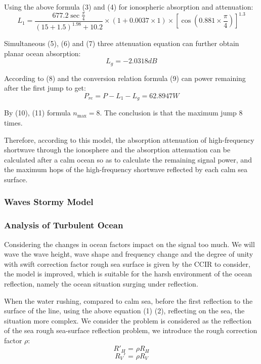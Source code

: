 \documentclass{mcmthesis}
\begin{document}
Using the above formula (3) and (4) for ionospheric absorption and attenuation:
\begin{equation} \label{12}
{L_1} = \frac{{677.2\sec \frac{\pi }{4}}}{{{{(15 + 1.5)}^{1.98}} + 10.2}} \times (1 + 0.0037 \times 1) \times {[\cos (0.881 \times \frac{\pi }{4})]^{1.3}}
\end{equation}

Simultaneous (5), (6) and (7) three attenuation equation can further obtain planar ocean absorption:
\begin{equation} \label{13}
{L_g} =  - 2.0318dB
\end{equation}

According to (8) and the conversion relation formula (9) can power remaining after the first jump to get:
\begin{equation} \label{14}
{P_{re}} = P - {L_1} - {L_g} = 62.8947W
\end{equation}

By (10), (11) formula ${n_{\max }} = 8$. The conclusion is that the maximum jump 8 times.

Therefore, according to this model, the absorption attenuation of high-frequency shortwave through the ionosphere and the absorption attenuation can be calculated after a calm ocean so as to calculate the remaining signal power, and the maximum hops of the high-frequency shortwave reflected by each calm sea surface.


\subsubsection{Waves Stormy Model}

\subsubsection{Analysis of Turbulent Ocean}
Considering the changes in ocean factors impact on the signal too much. We will wave the wave height, wave shape and frequency change and the degree of unity with swift correction factor   rough sea surface is given by the CCIR to consider, the model is improved, which is suitable for the harsh environment of the ocean reflection, namely the ocean situation surging under reflection.

When the water rushing, compared to calm sea, before the first reflection to the surface of the line, using the above equation (1) (2), reflecting on the sea, the situation more complex. We consider the problem is considered as the reflection of the sea rough sea-surface  reflection problem, we introduce the rough correction factor $\rho$:
\begin{equation} \label{15}
R{'_H}{\text{ = }}\rho {R_H}
\end{equation}
\begin{equation} \label{16}
{R_V}'{\text{ = }}\rho {R_V}
\end{equation}
\end{document}
